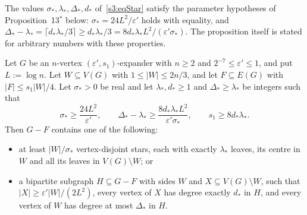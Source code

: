 The values $\sigma_*,\lambda_*,\Delta_*,d_*$ of~\eqref{s3:eqStar} satisfy the parameter
hypotheses of Proposition~13$^*$ below: $\sigma_*=24L^2/\varepsilon'$ holds with equality, and
$\Delta_*-\lambda_*=\lceil d_*\lambda_*/3\rceil\ge d_*\lambda_*/3=8d_*\lambda_*L^2/(\varepsilon'\sigma_*)$.
The proposition itself is stated for arbitrary numbers with these properties.

\begin{proposition}\label{s3:propP13s}
Let $G$ be an $n$-vertex $(\varepsilon',s_1)$-expander with $n\ge2$ and
$2^{-7}\le\varepsilon'\le1$, and put $L:=\log n$. Let
$W\subseteq V(G)$ with $1\le|W|\le 2n/3$, and let $F\subseteq E(G)$ with
$|F|\le s_1|W|/4$. Let $\sigma_*>0$ be real and let
$\lambda_*,d_*\ge1$ and $\Delta_*\ge\lambda_*$ be integers such that
\[
\sigma_*\ge\frac{24L^2}{\varepsilon'},\qquad
\Delta_*-\lambda_*\ge\frac{8d_*\lambda_*L^2}{\varepsilon'\sigma_*},\qquad
s_1\ge 8d_*\lambda_* .
\]
Then $G-F$ contains one of the following:
\begin{itemize}
\item[(a)] at least $|W|/\sigma_*$ vertex-disjoint stars, each with
  exactly $\lambda_*$ leaves, its centre in $W$ and all its leaves in
  $V(G)\setminus W$; or
\item[(b)] a bipartite subgraph $H\subseteq G-F$ with sides $W$ and
  $X\subseteq V(G)\setminus W$, such that $|X|\ge\varepsilon'|W|/(2L^2)$,
  every vertex of $X$ has degree exactly $d_*$ in $H$, and every vertex
  of $W$ has degree at most $\Delta_*$ in $H$.
\end{itemize}
\deps{\ref{s1:citProp12}, \ref{s1:citProp13}, \ref{s1:citDef11}}
\end{proposition}

